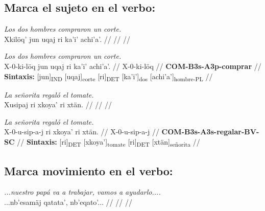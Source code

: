 \documentclass{article}%
\begin{document}
\subsection{Marca el sujeto en el verbo:}%
\label{subsec:Marcaelsujetoenelverbo}%

%
\par\medskip%
\ex
\textit{Los dos hombres compraron un corte.} \\
\begingl
\gla Xkilöq' jun uqaj ri ka'i' achi'a'. //
\glb  //
\glc  //
\endgl
\xe
%
\medskip%
\par\medskip%
\ex
\textit{Los dos hombres compraron un corte.} \\
\begingl
\gla X-0-ki-löq jun uqaj ri ka'i' achi'a'. //
\glb X-0-ki-löq //
\glc \textbf{COM-}\textbf{B3s-}\textbf{A3p-}\textbf{comprar} //
\glft \textbf{Sintaxis:} [jun]\textsubscript{IND} [uqaj]\textsubscript{corte} [ri]\textsubscript{DET} [ka'i']\textsubscript{dos} [achi'a']\textsubscript{hombre-PL} //
\endgl
\xe
%
\medskip%
\par\medskip%
\ex
\textit{La señorita regaló el tomate.} \\
\begingl
\gla Xusipaj ri xkoya' ri xtän. //
\glb  //
\glc  //
\endgl
\xe
%
\medskip%
\par\medskip%
\ex
\textit{La señorita regaló el tomate.} \\
\begingl
\gla X-0-u-sip-a-j ri xkoya' ri xtän. //
\glb X-0-u-sip-a-j //
\glc \textbf{COM-}\textbf{B3s-}\textbf{A3s-}\textbf{regalar-}\textbf{BV-}\textbf{SC} //
\glft \textbf{Sintaxis:} [ri]\textsubscript{DET} [xkoya']\textsubscript{tomate} [ri]\textsubscript{DET} [xtän]\textsubscript{señorita} //
\endgl
\xe
%
\medskip%
\subsection{Marca movimiento en el verbo:}%
\label{subsec:Marcamovimientoenelverbo}%

%
\par\medskip%
\ex
\textit{...nuestro papá va a trabajar, vamos a ayudarlo....} \\
\begingl
\gla ...nb'esamäj qatata', nb'eqato'... //
\glb  //
\glc  //
\endgl
\xe
%
\medskip

%
\end{document}
